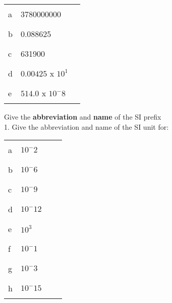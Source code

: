 \documentclass[12pt]{article}
\begin{document}
\label{table:2}
\begin{tabular}{ l l l  } 
a & 3780000000 & \noindent\rule{2cm}{0.4pt}\\ 
b & 0.088625 & \noindent\rule{2cm}{0.4pt}\\ 
c & 631900  & \noindent\rule{2cm}{0.4pt}\\
d & $0.00425$ x $10^1$ & \noindent\rule{2cm}{0.4pt}\\ 
e & $514.0$ x $10^-8$ & \noindent\rule{2cm}{0.4pt}\\
\end{tabular}
\newline %
Give the \textbf{abbreviation} and \textbf{name} of the SI prefix \\
\label{table:1}
\setlength{\linewidth}{3cm} 1. Give the abbreviation and name of the SI unit for:\\
\begin{tabular}{ l l l l } 
a & $10^-2$ & \noindent\rule{1cm}{0.4pt}  & \noindent\rule{2cm}{0.4pt}\\ 
b & $10^-6$ & \noindent\rule{1cm}{0.4pt} & \noindent\rule{2cm}{0.4pt}\\ 
c & $10^-9$  & \noindent\rule{1cm}{0.4pt} & \noindent\rule{2cm}{0.4pt}\\
d & $10^-12$ & \noindent\rule{1cm}{0.4pt} & \noindent\rule{2cm}{0.4pt}\\ 
e & $10^3$ & \noindent\rule{1cm}{0.4pt}  & \noindent\rule{2cm}{0.4pt}\\ 
f & $10^-1$ & \noindent\rule{1cm}{0.4pt} & \noindent\rule{2cm}{0.4pt}\\ 
g & $10^-3$  & \noindent\rule{1cm}{0.4pt} & \noindent\rule{2cm}{0.4pt}\\
h & $10^-15$ & \noindent\rule{1cm}{0.4pt} & \noindent\rule{2cm}{0.4pt}\\ 
\end{tabular}
\end{document}
